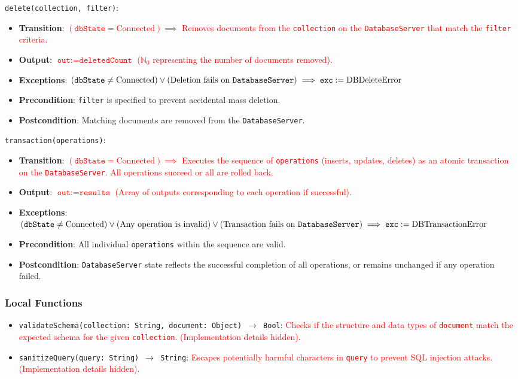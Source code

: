 \documentclass[12pt, titlepage]{article}
\begin{document}
\noindent \texttt{delete(collection, filter)}:
\begin{itemize}
    \item \textbf{Transition}: \textcolor{red}{$(\texttt{dbState} = \text{Connected}) \implies$ Removes documents from the \texttt{collection} on the \texttt{DatabaseServer} that match the \texttt{filter} criteria.}
    \item \textbf{Output}: \textcolor{red}{$\texttt{out} := \texttt{deletedCount}$ ($\mathbb{N}_0$ representing the number of documents removed).}
    \item \textbf{Exceptions}: \textcolor{red}{$(\texttt{dbState} \neq \text{Connected}) \lor (\text{Deletion fails on \texttt{DatabaseServer}}) \implies \texttt{exc} := \text{DBDeleteError}$}
    \item \textbf{Precondition}: \texttt{filter} is specified to prevent accidental mass deletion.
    \item \textbf{Postcondition}: Matching documents are removed from the \texttt{DatabaseServer}.
\end{itemize}

\noindent \texttt{transaction(operations)}:
\begin{itemize}
    \item \textbf{Transition}: \textcolor{red}{$(\texttt{dbState} = \text{Connected}) \implies$ Executes the sequence of \texttt{operations} (inserts, updates, deletes) as an atomic transaction on the \texttt{DatabaseServer}. All operations succeed or all are rolled back.}
    \item \textbf{Output}: \textcolor{red}{$\texttt{out} := \texttt{results}$ (Array of outputs corresponding to each operation if successful).}
    \item \textbf{Exceptions}: \textcolor{red}{$(\texttt{dbState} \neq \text{Connected}) \lor (\text{Any operation is invalid}) \lor (\text{Transaction fails on \texttt{DatabaseServer}}) \implies \texttt{exc} := \text{DBTransactionError}$}
    \item \textbf{Precondition}: All individual \texttt{operations} within the sequence are valid.
    \item \textbf{Postcondition}: \texttt{DatabaseServer} state reflects the successful completion of all operations, or remains unchanged if any operation failed.
\end{itemize}

\subsubsection{Local Functions}
\begin{itemize}
    \item \texttt{validateSchema(collection: String, document: Object) $\rightarrow$ Bool}: \textcolor{red}{Checks if the structure and data types of \texttt{document} match the expected schema for the given \texttt{collection}. (Implementation details hidden).}
    \item \texttt{sanitizeQuery(query: String) $\rightarrow$ String}: \textcolor{red}{Escapes potentially harmful characters in \texttt{query} to prevent SQL injection attacks. (Implementation details hidden).}
\end{itemize}
\end{document}
